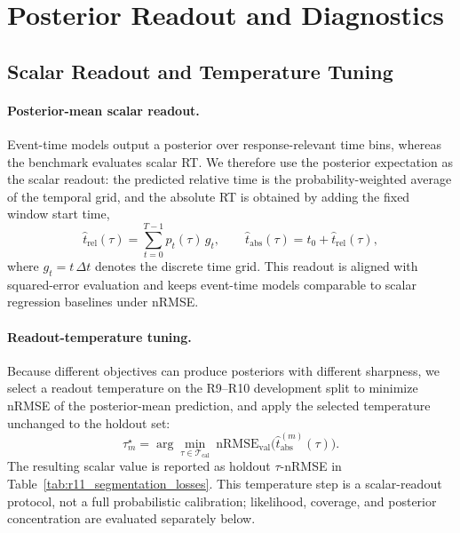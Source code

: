 \documentclass[12pt]{article}
\begin{document}
\section{Posterior Readout and Diagnostics}
\label{sec:posterior_diagnostics}

\subsection{Scalar Readout and Temperature Tuning}

\paragraph{Posterior-mean scalar readout.}
Event-time models output a posterior over response-relevant time bins, whereas the benchmark evaluates scalar RT. We therefore use the posterior expectation as the scalar readout: the predicted relative time is the probability-weighted average of the temporal grid, and the absolute RT is obtained by adding the fixed window start time,
\begin{equation}
\label{eq:rt_soft_argmax}
\hat t_{\mathrm{rel}}(\tau)=\sum_{t=0}^{T-1} p_t(\tau)\, g_t,
\qquad
\hat t_{\mathrm{abs}}(\tau)=t_0+\hat t_{\mathrm{rel}}(\tau),
\end{equation}
where $g_t=t\,\Delta t$ denotes the discrete time grid. This readout is aligned with squared-error evaluation and keeps event-time models comparable to scalar regression baselines under nRMSE.

\paragraph{Readout-temperature tuning.}
Because different objectives can produce posteriors with different sharpness, we select a readout temperature on the R9--R10 development split to minimize nRMSE of the posterior-mean prediction, and apply the selected temperature unchanged to the holdout set:
\begin{equation}
\label{eq:rt_tau_tuning}
\tau_m^\star = \arg\min_{\tau\in\mathcal{T}_{\text{cal}}}
\ \mathrm{nRMSE}_{\text{val}}\big(\hat t_{\mathrm{abs}}^{(m)}(\tau)\big).
\end{equation}
The resulting scalar value is reported as holdout \(\tau\)-nRMSE in Table~\ref{tab:r11_segmentation_losses}. This temperature step is a scalar-readout protocol, not a full probabilistic calibration; likelihood, coverage, and posterior concentration are evaluated separately below.
\end{document}
